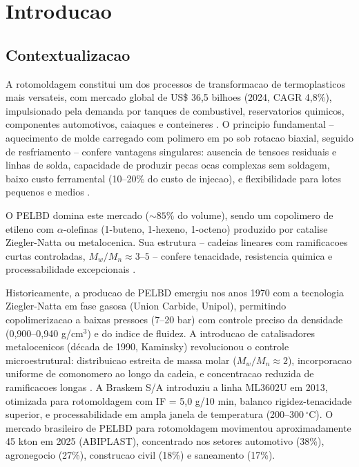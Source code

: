 \documentclass[11pt,a4paper,oneside]{article}
\begin{document}
\newpage
\renewcommand{\contentsname}{SUMARIO}\tableofcontents
\newpage

\section{Introducao}

\subsection{Contextualizacao}

A rotomoldagem constitui um dos processos de transformacao de termoplasticos mais versateis, com mercado global de US\$ 36,5 bilhoes (2024, CAGR 4,8\%), impulsionado pela demanda por tanques de combustivel, reservatorios quimicos, componentes automotivos, caiaques e conteineres \cite{Islabao2005}. O principio fundamental -- aquecimento de molde carregado com polimero em po sob rotacao biaxial, seguido de resfriamento -- confere vantagens singulares: ausencia de tensoes residuais e linhas de solda, capacidade de produzir pecas ocas complexas sem soldagem, baixo custo ferramental (10--20\% do custo de injecao), e flexibilidade para lotes pequenos e medios \cite{Coutinho2003}.

O PELBD domina este mercado (${\sim}85\%$ do volume), sendo um copolimero de etileno com $\alpha$-olefinas (1-buteno, 1-hexeno, 1-octeno) produzido por catalise Ziegler-Natta ou metalocenica. Sua estrutura -- cadeias lineares com ramificacoes curtas controladas, $M_w/M_n{\approx}3$--$5$ -- confere tenacidade, resistencia quimica e processabilidade excepcionais \cite{Coutinho2003, Kim2010}.

Historicamente, a producao de PELBD emergiu nos anos 1970 com a tecnologia Ziegler-Natta em fase gasosa (Union Carbide, Unipol), permitindo copolimerizacao a baixas pressoes (7--20 bar) com controle preciso da densidade (0,900--0,940 g/cm$^3$) e do indice de fluidez. A introducao de catalisadores metalocenicos (década de 1990, Kaminsky) revolucionou o controle microestrutural: distribuicao estreita de massa molar ($M_w/M_n{\approx}2$), incorporacao uniforme de comonomero ao longo da cadeia, e concentracao reduzida de ramificacoes longas \cite{Coutinho2003}. A Braskem S/A introduziu a linha ML3602U em 2013, otimizada para rotomoldagem com IF = 5,0 g/10 min, balanco rigidez-tenacidade superior, e processabilidade em ampla janela de temperatura (200--300$\,^{\circ}$C). O mercado brasileiro de PELBD para rotomoldagem movimentou aproximadamente 45 kton em 2025 (ABIPLAST), concentrado nos setores automotivo (38\%), agronegocio (27\%), construcao civil (18\%) e saneamento (17\%).
\end{document}
